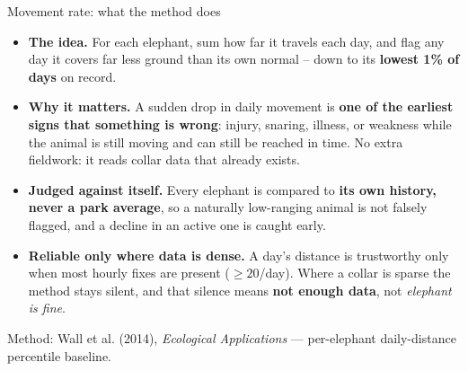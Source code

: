 \documentclass{beamer}
\newcommand{\hi}[1]{\textbf{\textcolor{hicolor}{#1}}}
\begin{document}
	\begin{frame}{Movement rate: what the method does}
		\small
		\begin{itemize}
			\item \textbf{The idea.} For each elephant, sum how far it travels each day,
			and flag any day it covers far less ground than its own normal -- down to
			its \hi{lowest 1\% of days} on record.
			\item \textbf{Why it matters.} A sudden drop in daily movement is
			\hi{one of the earliest signs that something is wrong}: injury, snaring,
			illness, or weakness while the animal is still moving and can still be
			reached in time. No extra fieldwork: it reads collar data that already exists.
			\item \textbf{Judged against itself.} Every elephant is compared to
			\hi{its own history, never a park average}, so a naturally low-ranging
			animal is not falsely flagged, and a decline in an active one is caught early.
			\item \textbf{Reliable only where data is dense.} A day's distance is
			trustworthy only when most hourly fixes are present ($\geq 20$/day). Where a
			collar is sparse the method stays silent, and that silence means
			\hi{not enough data}, not \emph{elephant is fine}.
		\end{itemize}
		\vfill
		{\footnotesize Method: Wall et al. (2014), \textit{Ecological Applications} ---
			per-elephant daily-distance percentile baseline.}
	\end{frame}
	
	
	
\end{document}
